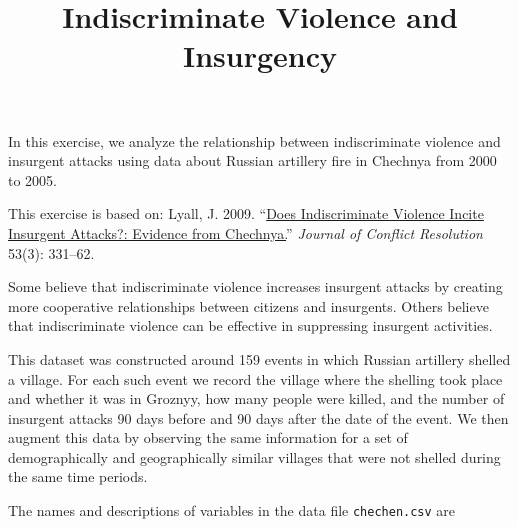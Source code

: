 \documentclass[]{article}
\title{Indiscriminate Violence and Insurgency}
\author{}
\date{}
\begin{document}
\maketitle


In this exercise, we analyze the relationship between indiscriminate
violence and insurgent attacks using data about Russian artillery fire
in Chechnya from 2000 to 2005.

This exercise is based on: Lyall, J. 2009.
``\href{http://dx.doi.org/10.1177/0022002708330881}{Does Indiscriminate
Violence Incite Insurgent Attacks?: Evidence from Chechnya.}''
\emph{Journal of Conflict Resolution} 53(3): 331--62.

Some believe that indiscriminate violence increases insurgent attacks by
creating more cooperative relationships between citizens and insurgents.
Others believe that indiscriminate violence can be effective in
suppressing insurgent activities.

This dataset was constructed around 159 events in which Russian
artillery shelled a village. For each such event we record the village
where the shelling took place and whether it was in Groznyy, how many
people were killed, and the number of insurgent attacks 90 days before
and 90 days after the date of the event. We then augment this data by
observing the same information for a set of demographically and
geographically similar villages that were not shelled during the same
time periods.

The names and descriptions of variables in the data file
\texttt{chechen.csv} are
\end{document}
